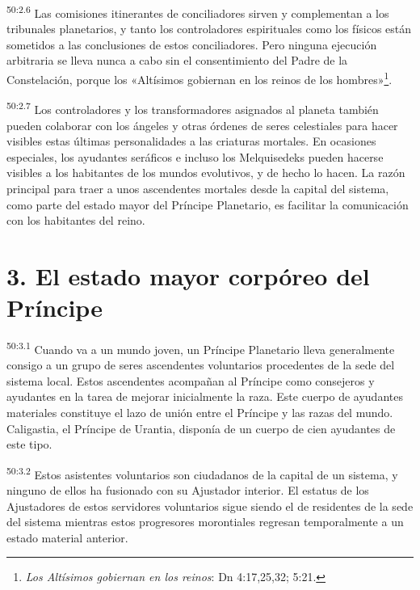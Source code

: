 \par
\textsuperscript{50:2.6} Las comisiones itinerantes de conciliadores sirven y complementan a los tribunales planetarios, y tanto los controladores espirituales como los físicos están sometidos a las conclusiones de estos conciliadores. Pero ninguna ejecución arbitraria se lleva nunca a cabo sin el consentimiento del Padre de la Constelación, porque los «Altísimos gobiernan en los reinos de los hombres»\footnote{\textit{Los Altísimos gobiernan en los reinos}: Dn 4:17,25,32; 5:21.}.

\par
\textsuperscript{50:2.7} Los controladores y los transformadores asignados al planeta también pueden colaborar con los ángeles y otras órdenes de seres celestiales para hacer visibles estas últimas personalidades a las criaturas mortales. En ocasiones especiales, los ayudantes seráficos e incluso los Melquisedeks pueden hacerse visibles a los habitantes de los mundos evolutivos, y de hecho lo hacen. La razón principal para traer a unos ascendentes mortales desde la capital del sistema, como parte del estado mayor del Príncipe Planetario, es facilitar la comunicación con los habitantes del reino.

\section*{3. El estado mayor corpóreo del Príncipe}
\par
\textsuperscript{50:3.1} Cuando va a un mundo joven, un Príncipe Planetario lleva generalmente consigo a un grupo de seres ascendentes voluntarios procedentes de la sede del sistema local. Estos ascendentes acompañan al Príncipe como consejeros y ayudantes en la tarea de mejorar inicialmente la raza. Este cuerpo de ayudantes materiales constituye el lazo de unión entre el Príncipe y las razas del mundo. Caligastia, el Príncipe de Urantia, disponía de un cuerpo de cien ayudantes de este tipo.

\par
\textsuperscript{50:3.2} Estos asistentes voluntarios son ciudadanos de la capital de un sistema, y ninguno de ellos ha fusionado con su Ajustador interior. El estatus de los Ajustadores de estos servidores voluntarios sigue siendo el de residentes de la sede del sistema mientras estos progresores morontiales regresan temporalmente a un estado material anterior.

